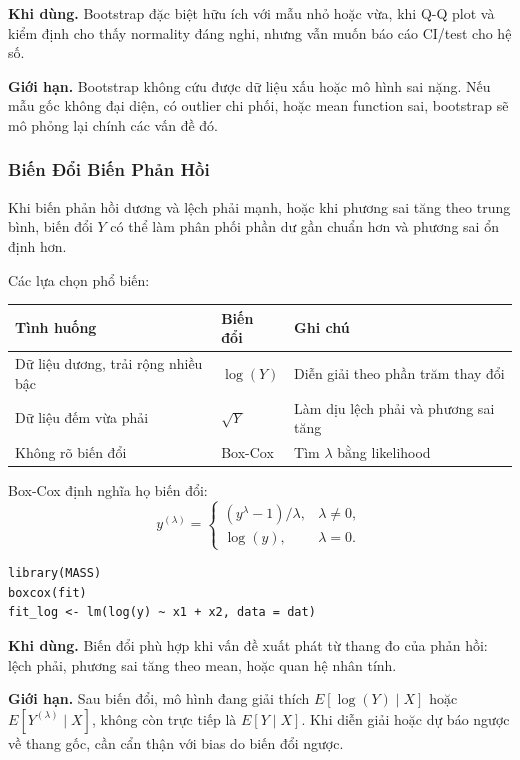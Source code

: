 \textbf{Khi dùng.} Bootstrap đặc biệt hữu ích với mẫu nhỏ hoặc vừa, khi Q-Q plot và kiểm định cho thấy normality đáng nghi, nhưng vẫn muốn báo cáo CI/test cho hệ số.

\textbf{Giới hạn.} Bootstrap không cứu được dữ liệu xấu hoặc mô hình sai nặng. Nếu mẫu gốc không đại diện, có outlier chi phối, hoặc mean function sai, bootstrap sẽ mô phỏng lại chính các vấn đề đó.

\subsubsection{Biến Đổi Biến Phản Hồi}

Khi biến phản hồi dương và lệch phải mạnh, hoặc khi phương sai tăng theo trung bình, biến đổi $Y$ có thể làm phân phối phần dư gần chuẩn hơn và phương sai ổn định hơn.

Các lựa chọn phổ biến:
\begin{center}
\small
\begin{tabularx}{\textwidth}{@{}>{\raggedright\arraybackslash}X>{\raggedright\arraybackslash}p{2.4cm}>{\raggedright\arraybackslash}X@{}}
\toprule
\textbf{Tình huống} & \textbf{Biến đổi} & \textbf{Ghi chú} \\
\midrule
Dữ liệu dương, trải rộng nhiều bậc & $\log(Y)$ & Diễn giải theo phần trăm thay đổi \\
Dữ liệu đếm vừa phải & $\sqrt{Y}$ & Làm dịu lệch phải và phương sai tăng \\
Không rõ biến đổi & Box-Cox & Tìm $\lambda$ bằng likelihood \\
\bottomrule
\end{tabularx}
\end{center}

Box-Cox định nghĩa họ biến đổi:
\[
  y^{(\lambda)} =
  \begin{cases}
    (y^\lambda - 1)/\lambda, & \lambda \neq 0,\\
    \log(y), & \lambda = 0.
  \end{cases}
\]

\begin{lstlisting}[style=Rstyle]
library(MASS)
boxcox(fit)
fit_log <- lm(log(y) ~ x1 + x2, data = dat)
\end{lstlisting}

\textbf{Khi dùng.} Biến đổi phù hợp khi vấn đề xuất phát từ thang đo của phản hồi: lệch phải, phương sai tăng theo mean, hoặc quan hệ nhân tính.

\textbf{Giới hạn.} Sau biến đổi, mô hình đang giải thích $E[\log(Y)\mid X]$ hoặc $E[Y^{(\lambda)}\mid X]$, không còn trực tiếp là $E[Y\mid X]$. Khi diễn giải hoặc dự báo ngược về thang gốc, cần cẩn thận với bias do biến đổi ngược.

